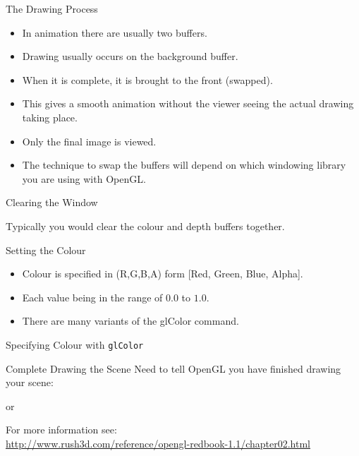 \documentclass[aspectratio=1610,xcolor=dvipsnames,t]{beamer}
\newcommand{\showcode}[1]{\begin{mdframed}[style=code] %
                          \end{mdframed}%
}
\begin{document}
\begin{frame}{The Drawing Process}
    \showcode{draw.c} 
    \begin{itemize} 
        \item In animation there are usually two buffers. 
        \item Drawing usually occurs on the background buffer. 
        \item When it is complete, it is brought to the front (swapped). 
        \item This gives a smooth animation without the viewer seeing the 
              actual drawing taking place. 
        \item Only the final image is viewed.
        \item The technique to swap the buffers will depend on which 
              windowing library you are using with OpenGL.
    \end{itemize} 
\end{frame} 

\begin{frame}{Clearing the Window} 
    \showcode{clearcolor.c} 
    Typically you would clear the colour and depth buffers together.
    \showcode{clear.c} 
\end{frame} 

\begin{frame}{Setting the Colour} 
    \begin{itemize}
        \item Colour is specified in (R,G,B,A) form [Red, Green, Blue, Alpha].
        \item Each value being in the range of $0.0$ to $1.0$.
        \item There are many variants of the glColor command.
    \end{itemize} 
    \begin{block}{Specifying Colour with \texttt{glColor}}
        \showcode{color.c} 
    \end{block} 
\end{frame} 

\begin{frame}{Complete Drawing the Scene} 
    Need to tell OpenGL you have finished drawing your scene:
    \showcode{glfinish.c} 
    or
    \showcode{glflush.c} 
    For more information see:\\
    \small
    \url{http://www.rush3d.com/reference/opengl-redbook-1.1/chapter02.html}
    \normalsize
\end{frame} 
\end{document}
